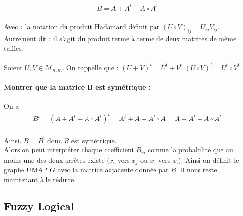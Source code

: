         \begin{eqnarray}
            B = A + A^t - A \circ A^t
        \end{eqnarray}
        \\
        Avec $\circ$ la notation du produit Hadamard définit par $(U \circ V)_{ij} = U_{ij}V_{ij}$. Autrement dit : il s’agit du produit terme à terme de deux matrices de même tailles.
        \\
        \\
        Soient $U, V \in \mathcal{M}_{n,m}$. On rappelle que : 
            $(U+V)^t = U^t + V^t$
            $(U \circ V)^t = U^t \circ V^t$
        \\
        \\
        \textbf{Montrer que la matrice B est symétrique : }
        \\
        \\
        On a :
        \\
        \begin{eqnarray}
            B^t  = (A + A^t - A \circ A^t)^t 
                = A^t + A - A^t \circ A
                = A + A^t - A \circ A^t
        \end{eqnarray}
        \\
        Ainsi, $B = B^t$ donc $B$ est symétrique.
        \\
        Alors on peut interpréter chaque coefficient $B_{ij}$ comme la probabilité que au moins une des deux
        arrêtes existe ($x_i$ vers $x_j$ ou $x_j$ vers $x_i$).
        Ainsi on définit le graphe UMAP $G$ avec la matrice adjacente donnée par $B$. Il nous reste maintenant
        à le réduire.



        \subsection*{Fuzzy Logical}







